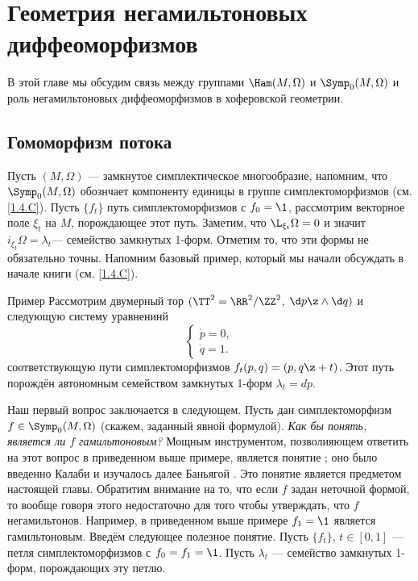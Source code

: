 \chapter[Негамильтоновы диффеоморфизмы]{Геометрия негамильтоновых диффеоморфизмов}

В этой главе мы обсудим связь между группами $\Ham(M,\Omega)$ и $\Symp_0(M,\Omega)$ и роль негамильтоновых диффеоморфизмов в хоферовской геометрии.

\section{Гомоморфизм потока}

Пусть $(M,\Omega)$ --- замкнутое симплектическое многообразие, напомним, что $\Symp_0(M,\Omega)$ обознчает компоненту единицы в группе симплектоморфизмов (см. \ref{1.4.C}).
Пусть $\{f_t\}$  путь симплектоморфизмов с $f_0 = \1$,
рассмотрим векторное поле $\xi_t$ на $M$, порождающее этот путь.
Заметим, что $\L_{\xi_t}\Omega=0$ и значит  $i_{\xi_t}\Omega=\lambda_t$ ​​--- семейство замкнутых 1-форм.
Отметим то, что эти формы не обязательно точны.
Напомним базовый пример, который мы начали обсуждать в начале книги (см. \ref{1.4.C}).

\begin{thm}{Пример}\label{14.1.A}
Рассмотрим двумерный тор $(\TT^2=\RR^2/\ZZ^2$, $\d p\z\wedge \d q)$ и следующую систему уравненинй
\[
\begin{cases}
\dot p=0,
\\
\dot q=1.
\end{cases}
\]
соответствующую пути симплектоморфизмов $f_t(p, q) = (p, q \z+ t)$.
Этот путь порождён автономным семейством замкнутых 1-форм $\lambda_t = dp$.
\end{thm}


Наш первый вопрос заключается в следующем.
Пусть дан симплектоморфизм $f\in\Symp_0(M,\Omega)$ (скажем, заданный явной формулой).
\textit{Как бы понять, является ли $f$ гамильтоновым?}
Мощным инструментом, позволияющем ответить на этот вопрос в приведенном выше примере, является понятие ; оно было введенно Калаби и изучалось далее Баньягой \cite{B1}.
Это понятие является предметом настоящей главы.
Обратитим внимание на то, что если $f$ задан неточной формой, то вообще говоря этого недостаточно для того чтобы утверждать, что $f$ негамильтонов.
Например, в приведенном выше примере $f_1 = \1$ является гамильтоновым.
Введём следующее полезное понятие.
Пусть $\{f_t\}$, $t\in[0,1]$ --- петля симплектоморфизмов с $f_0 = f_1 = \1$.
Пусть ${\lambda_t}$ --- семейство замкнутых 1-форм, порождающих эту петлю.

